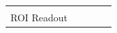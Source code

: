 \begin{table}[]
\begin{tabular}{|l|l|l|l|l}
                     &                                                                             &                                                                          &                                                                                  &  \\ \cline{1-4}
ROI Readout          &                                                                             &                                                                          &                                                                                  &  \\ \cline{1-4}
\end{tabular}
\end{table}






 